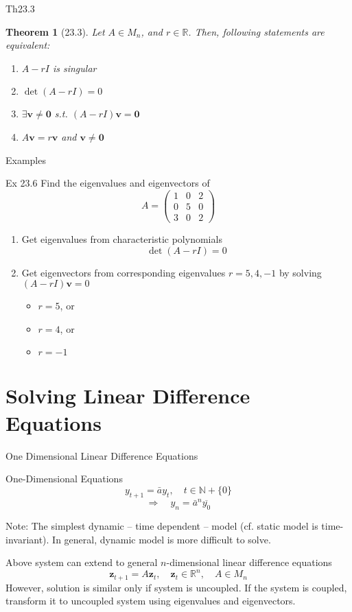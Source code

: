 \documentclass[a4paper,11pt]{article}
\newtheorem{thm}{Theorem}
\newcommand{\bb}{\mathbb}
\newcommand{\bd}{\mathbf}
\begin{document}
\begin{frame}[t]{Th23.3}
	\begin{thm}
		[23.3] Let $A\in M_n$, and $r\in\bb{R}$. Then, following statements are equivalent:
		\begin{enumerate}
			\item $A-rI$ is singular
			\item $\det(A-rI)=0$
			\item $\exists \bd{v}\neq\bd{0}$ s.t. $(A-rI)\bd{v}=\bd{0}$
			\item $A\bd{v}=r\bd{v}$ and $\bd{v}\neq \bd{0}$
		\end{enumerate}
	\end{thm}
\end{frame}

\begin{frame}[t]{Examples}
	\begin{block}
		{Ex 23.6} Find the eigenvalues and eigenvectors of \[
			A = \begin{pmatrix}
				1&0&2\\
				0&5&0\\
				3&0&2
			\end{pmatrix}
		\]
		\begin{enumerate}[Step 1)]
			\item Get eigenvalues from characteristic polynomials
			\[
				\det (A-rI) = 0
			\]
			\item Get eigenvectors from corresponding eigenvalues $r=5,4,-1$ by solving $(A-rI)\bd{v}=0$
			\begin{itemize}
				\item $r=5$, or
				\item $r=4$, or
				\item $r=-1$
			\end{itemize}
		\end{enumerate}
	\end{block}
\end{frame}

\section{Solving Linear Difference Equations} %
\label{sec:solving_linear_difference_equations}
\begin{frame}[t]{One Dimensional Linear Difference Equations}
	\begin{block}
		{One-Dimensional Equations}
		\[
			y_{t+1} = \bar{a}y_t, \quad t\in \bb{N}+\{0\}
		\]
		\[
			\Rightarrow\quad y_n = \bar{a}^n \overline{y_0}
		\]
	\end{block}
	Note: The simplest dynamic -- time dependent -- model (cf. static model is time-invariant). In general, dynamic model is more difficult to solve.
	
	Above system can extend to general $n$-dimensional linear difference equations\[
		\bd{z}_{t+1}=A\bd{z}_t, \quad \bd{z}_t\in \bb{R}^n,\quad A\in M_n
	\]
	However, solution is similar only if system is uncoupled. If the system is coupled, transform it to uncoupled system using eigenvalues and eigenvectors. 
\end{frame}
\end{document}

